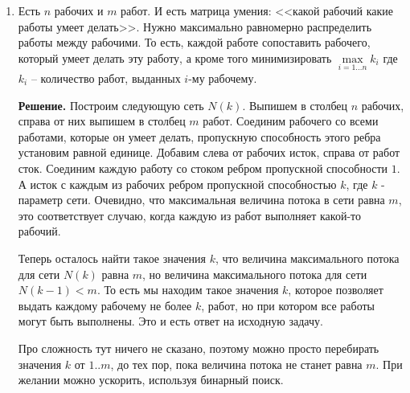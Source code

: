 \begin{enumerate}
	\item Есть $n$ рабочих и $m$ работ. И есть матрица умения: <<какой рабочий какие работы умеет делать>>. Нужно 
	максимально равномерно распределить работы между рабочими. То есть, каждой работе сопоставить рабочего, который 
	умеет делать эту работу, а кроме того минимизировать $\max\limits_{i=1\dots n} k_i$ где $k_i$ – количество 
	работ, выданных $i$-му рабочему.
	
	\textbf{Решение.} Построим следующую сеть $N(k)$. Выпишем в столбец $n$ рабочих, справа от них выпишем в 
	столбец $m$ работ. Соединим рабочего со всеми работами, которые он умеет делать, пропускную способность 
	этого ребра установим равной единице. Добавим слева от рабочих исток, справа от работ сток. Соединим каждую 
	работу со стоком ребром пропускной способности $1$. А исток с каждым из рабочих ребром пропускной 
	способностью $k$, где $k$ - параметр сети. Очевидно, что максимальная величина потока в сети равна $m$, это 
	соответствует случаю, когда каждую из работ выполняет какой-то рабочий.
	
	Теперь осталось найти такое значения $k$, что величина максимального потока для сети $N(k)$ равна $m$, но 
	величина максимального потока для сети $N(k - 1) < m$. То есть мы находим такое значения $k$, которое 
	позволяет выдать каждому рабочему не более $k$, работ, но при котором все работы могут быть выполнены. Это и 
	есть ответ на исходную задачу.
	
	Про сложность тут ничего не сказано, поэтому можно просто перебирать значения $k$ от $1..m$, до тех пор, 
	пока величина потока не станет равна $m$. При желании можно ускорить, используя бинарный поиск.
	
\end{enumerate}
